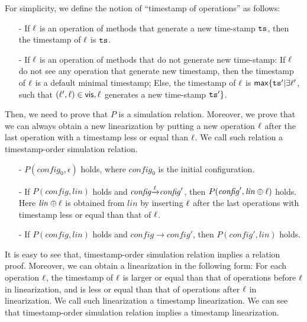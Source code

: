 For simplicity, we define the notion of ``timestamp of operations'' as follows: 

\begin{itemize}
\setlength{\itemsep}{0.5pt}
\item[-] If $\ell$ is an operation of methods that generate a new time-stamp $\mathtt{ts}$, then the timestamp of $\ell$ is $\mathtt{ts}$. 

\item[-] If $\ell$ is an operation of methods that do not generate new time-stamp: If $\ell$ do not see any operation that generate new timestamp, then the timestamp of $\ell$ is a default minimal timestamp; Else, the timestamp of $\ell$ is $\mathsf{max} \{ \mathtt{ts}' \vert \exists \ell'$, such that $(\ell',\ell) \in \mathsf{vis}, \ell$ generates a new time-stamp $\mathtt{ts}' \}$. 
\end{itemize} 

Then, we need to prove that $P$ is a simulation relation. Moreover, we prove that we can always obtain a new linearization by putting a new operation $\ell$ after the last operation with a timestamp less or equal than $\ell$. We call such relation a timestamp-order simulation relation. 

\begin{itemize}
\setlength{\itemsep}{0.5pt}
\item[-] $P(\mathit{config}_0,\epsilon)$ holds, where $\mathit{config}_0$ is the initial configuration.

\item[-] If $P(\mathit{config},\mathit{lin})$ holds and $\mathit{config} {\xrightarrow{\ell}} \mathit{config}'$, then $P(\mathit{config}', \mathit{lin} \oplus \ell)$ holds. Here  $\mathit{lin} \oplus \ell$ is obtained from $\mathit{lin}$ by inserting $\ell$ after the last operations with timestamp less or equal than that of $\ell$. 

\item[-] If $P(\mathit{config},\mathit{lin})$ holds and $\mathit{config} {\xrightarrow{}} \mathit{config}'$, then $P(\mathit{config}',\mathit{lin})$ holds.
\end{itemize}

It is easy to see that, timestamp-order simulation relation implies a \crdtlinearizable{} relation proof. Moreover, we can obtain a linearization in the following form: For each operation $\ell$, the timestamp of $\ell$ is larger or equal than that of operations before $\ell$ in linearization, and is less or equal than that of operations after $\ell$ in linearization. We call such linearization a timestamp linearization. We can see that timestamp-order simulation relation implies a timestamp linearization.

